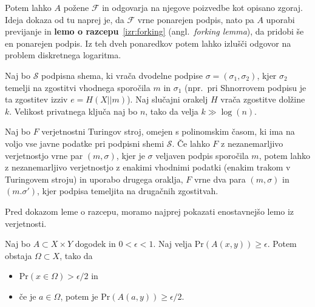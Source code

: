 \documentclass[isrm2, tisk]{fmfdelo}
\begin{document}
Potem lahko $A$ požene $\mathcal{F}$ in odgovarja na njegove poizvedbe kot opisano zgoraj. Ideja
dokaza od tu naprej je, da $\mathcal{F}$ vrne ponarejen podpis, nato pa $A$ uporabi previjanje in
\textbf{lemo o razcepu}~\ref{izr:forking} (angl.\ \textit{forking lemma}), da pridobi še en ponarejen 
podpis. Iz teh dveh ponaredkov potem lahko izlušči odgovor na problem diskretnega logaritma.

\begin{izrek}
\label{izr:forking}
    Naj bo $\mathcal{S}$ podpisna shema, ki vrača dvodelne podpise $\sigma = (\sigma_1, \sigma_2)$,
    kjer $\sigma_2$ temelji na zgostitvi vhodnega sporočila $m$ in $\sigma_1$ (npr.\ pri Shnorrovem 
    podpisu je ta zgostitev izziv  $e = H(X || m)$). Naj slučajni orakelj $H$ vrača zgostitve
    dolžine $k$. Velikost privatnega ključa naj bo $n$, tako da velja $k \gg \log(n)$.

    Naj bo $F$ verjetnostni Turingov stroj, omejen s polinomskim časom, ki ima na voljo vse javne
    podatke pri podpisni shemi $\mathcal{S}$. Če lahko $F$ z nezanemarljivo verjetnostjo vrne par 
    $(m, \sigma)$, kjer je $\sigma$  veljaven podpis sporočila $m$, potem lahko z nezanemarljivo 
    verjetnostjo z enakimi vhodnimi podatki (enakim trakom v Turingovem stroju) in uporabo drugega 
    oraklja, $F$ vrne dva para  $(m, \sigma)$ in $(m. \sigma')$, kjer podpisa temeljita na 
    drugačnih zgostitvah.
\end{izrek}

Pred dokazom leme o razcepu, moramo najprej pokazati enostavnejšo lemo iz verjetnosti.

\begin{lema}
\label{lema:verjetnost}
    Naj bo $A \subset X \times Y$ dogodek in $0 < \epsilon < 1$. Naj velja $\text{Pr}(A(x, y)) \geq \epsilon$. 
    Potem obstaja $\Omega \subset X$, tako da \begin{itemize}
        \item $\text{Pr}(x \in \Omega) > \epsilon / 2$ in
        \item če je $a \in \Omega$, potem je $\text{Pr}(A(a, y)) \geq \epsilon / 2$.
    \end{itemize}
\end{lema}
\end{document}
